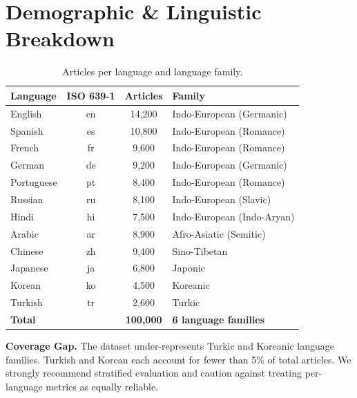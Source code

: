 \section{Demographic \& Linguistic Breakdown}

\begin{table}[H]
\centering
\caption{Articles per language and language family.}
\begin{tabularx}{\linewidth}{@{}lcc>{\raggedright\arraybackslash}X@{}}
  \toprule
  \textbf{Language} & \textbf{ISO 639-1} & \textbf{Articles} & \textbf{Family} \\
  \midrule
  English    & en & 14{,}200 & Indo-European (Germanic) \\
  Spanish    & es & 10{,}800 & Indo-European (Romance) \\
  French     & fr &  9{,}600 & Indo-European (Romance) \\
  German     & de &  9{,}200 & Indo-European (Germanic) \\
  Portuguese & pt &  8{,}400 & Indo-European (Romance) \\
  Russian    & ru &  8{,}100 & Indo-European (Slavic) \\
  Hindi      & hi &  7{,}500 & Indo-European (Indo-Aryan) \\
  Arabic     & ar &  8{,}900 & Afro-Asiatic (Semitic) \\
  Chinese    & zh &  9{,}400 & Sino-Tibetan \\
  Japanese   & ja &  6{,}800 & Japonic \\
  Korean     & ko &  4{,}500 & Koreanic \\
  Turkish    & tr &  2{,}600 & Turkic \\
  \midrule
  \textbf{Total} & & \textbf{100{,}000} & \textbf{6 language families} \\
  \bottomrule
\end{tabularx}
\end{table}

\begin{warnbox}
  \textbf{\textcolor{orange}{\faExclamationTriangle}\quad Coverage Gap.}
  The dataset under-represents Turkic and Koreanic language families. Turkish and Korean
  each account for fewer than 5\% of total articles. We strongly recommend stratified
  evaluation and caution against treating per-language metrics as equally reliable.
\end{warnbox}

